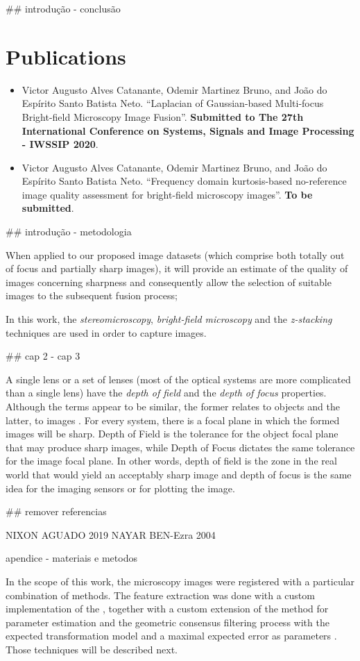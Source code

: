 ## introdução - conclusão

\section*{Publications}

\begin{itemize}
    \item Victor Augusto Alves Catanante, Odemir Martinez Bruno, and João do Espírito Santo Batista Neto. ``Laplacian of Gaussian-based Multi-focus Bright-field Microscopy Image Fusion''. \textbf{Submitted to The 27th International Conference on Systems, Signals and Image Processing - IWSSIP 2020}.
    
    \item \cite{catanante2020frequency} Victor Augusto Alves Catanante, Odemir Martinez Bruno, and João do Espírito Santo Batista Neto. ``Frequency domain kurtosis-based no-reference image quality assessment for bright-field microscopy images''. \textbf{To be submitted}.
\end{itemize}

## introdução - metodologia

When applied to our proposed image datasets (which comprise both totally out of focus and partially sharp images), it will provide an estimate of the quality of images concerning sharpness and consequently allow the selection of suitable images to the subsequent fusion process;

In this work, the \emph{stereomicroscopy}, \emph{bright-field microscopy} and the \emph{z-stacking} techniques are used in order to capture images.

## cap 2 - cap 3

A single lens or a set of lenses (most of the optical systems are more complicated than a single lens) have the \emph{depth of field} and the \emph{depth of focus} properties. Although the terms appear to be similar, the former relates to objects and the latter, to images \cite{davidson2002optical}. For every system, there is a focal plane in which the formed images will be sharp. Depth of Field is the tolerance for the object focal plane that may produce sharp images, while Depth of Focus dictates the same tolerance for the image focal plane. In other words, depth of field is the zone in the real world that would yield an acceptably sharp image and depth of focus is the same idea for the imaging sensors or for plotting the image.

## remover referencias

NIXON AGUADO 2019
NAYAR BEN-Ezra 2004

apendice - materiais e metodos

In the scope of this work, the microscopy images were registered with a particular combination of methods. The feature extraction was done with a custom implementation of the , together with a custom extension of the  method for parameter estimation and the geometric consensus filtering process with the expected transformation model and a maximal expected error as parameters \cite{saalfeld2019computational}. Those techniques will be described next.
